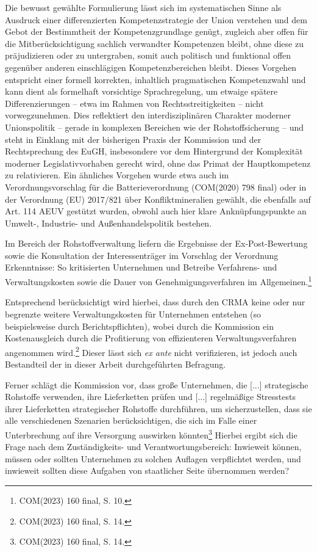 \documentclass[12pt,a4paper,oneside]{book} %
\begin{document}
Die bewusst gewählte Formulierung lässt sich im systematischen Sinne als Ausdruck einer differenzierten Kompetenzstrategie der Union verstehen und dem Gebot der Bestimmtheit der Kompetenzgrundlage genügt, zugleich aber offen für die Mitberücksichtigung sachlich verwandter Kompetenzen bleibt, ohne diese zu präjudizieren oder zu untergraben, somit auch politisch und funktional offen gegenüber anderen einschlägigen Kompetenzbereichen bleibt. Dieses Vorgehen entspricht einer formell korrekten, inhaltlich pragmatischen Kompetenzwahl und kann dient  als formelhaft vorsichtige Sprachregelung, um etwaige spätere Differenzierungen – etwa im Rahmen von Rechtsstreitigkeiten – nicht vorwegzunehmen. Dies reflektiert den interdisziplinären Charakter moderner Unionspolitik – gerade in komplexen Bereichen wie der Rohstoffsicherung – und steht in Einklang mit der bisherigen Praxis der Kommission und der Rechtsprechung des EuGH, insbesondere vor dem Hintergrund der Komplexität moderner Legislativvorhaben gerecht wird, ohne das Primat der Hauptkompetenz zu relativieren. Ein ähnliches Vorgehen wurde etwa auch im Verordnungsvorschlag für die Batterieverordnung (COM(2020) 798 final) oder in der Verordnung (EU) 2017/821 über Konfliktmineralien gewählt, die ebenfalls auf Art. 114 AEUV gestützt wurden, obwohl auch hier klare Anknüpfungspunkte an Umwelt-, Industrie- und Außenhandelspolitik bestehen.

Im Bereich der Rohstoffverwaltung liefern die Ergebnisse der Ex-Post-Bewertung sowie die Konsultation der Interessenträger im Vorschlag der Verordnung Erkenntnisse: So kritisierten Unternehmen und Betreibe Verfahrens- und Verwaltungskosten sowie die Dauer von Genehmigungsverfahren im Allgemeinen.\footnote{COM(2023) 160 final, S. 10.}

Entsprechend berücksichtigt wird hierbei, dass durch den CRMA keine oder nur begrenzte weitere Verwaltungskosten für Unternehmen entstehen (so beispielsweise durch Berichtspflichten), wobei durch die Kommission ein Kostenausgleich durch die Profitierung von effizienteren Verwaltungsverfahren angenommen wird.\footnote{COM(2023) 160 final, S. 14.} Dieser lässt sich \textit{ex ante} nicht verifizieren, ist jedoch auch Bestandteil der in dieser Arbeit durchgeführten Befragung. %

Ferner schlägt die Kommission vor, dass \glqq große Unternehmen, die [...] strategische Rohstoffe verwenden, ihre Lieferketten prüfen und [...] regelmäßige Stresstests ihrer Lieferketten strategischer Rohstoffe durchführen, um sicherzustellen, dass sie alle verschiedenen Szenarien berücksichtigen, die sich im Falle einer Unterbrechung auf ihre Versorgung auswirken könnten\grqq \footnote{COM(2023) 160 final, S. 14.} Hierbei ergibt sich die Frage nach dem Zuständigkeits- und Verantwortungsbereich: Inwieweit können, müssen oder sollten Unternehmen zu solchen Auflagen verpflichtet werden, und inwieweit sollten diese Aufgaben von staatlicher Seite übernommen werden?
\end{document}
